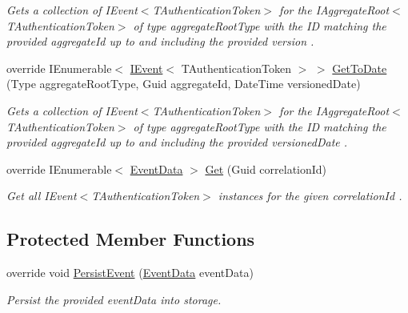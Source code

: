 \begin{DoxyCompactItemize}
\begin{DoxyCompactList}\small\item\em Gets a collection of I\+Event$<$\+T\+Authentication\+Token$>$ for the I\+Aggregate\+Root$<$\+T\+Authentication\+Token$>$ of type {\itshape aggregate\+Root\+Type}  with the ID matching the provided {\itshape aggregate\+Id}  up to and including the provided {\itshape version} . \end{DoxyCompactList}\item 
override I\+Enumerable$<$ \hyperlink{interfaceCqrs_1_1Events_1_1IEvent}{I\+Event}$<$ T\+Authentication\+Token $>$ $>$ \hyperlink{classCqrs_1_1Azure_1_1BlobStorage_1_1Events_1_1BlobStorageEventStore_a3c2ec49781bbcf7e0c2549133c160591_a3c2ec49781bbcf7e0c2549133c160591}{Get\+To\+Date} (Type aggregate\+Root\+Type, Guid aggregate\+Id, Date\+Time versioned\+Date)
\begin{DoxyCompactList}\small\item\em Gets a collection of I\+Event$<$\+T\+Authentication\+Token$>$ for the I\+Aggregate\+Root$<$\+T\+Authentication\+Token$>$ of type {\itshape aggregate\+Root\+Type}  with the ID matching the provided {\itshape aggregate\+Id}  up to and including the provided {\itshape versioned\+Date} . \end{DoxyCompactList}\item 
override I\+Enumerable$<$ \hyperlink{classCqrs_1_1Events_1_1EventData}{Event\+Data} $>$ \hyperlink{classCqrs_1_1Azure_1_1BlobStorage_1_1Events_1_1BlobStorageEventStore_a660c786205693ee34a11e205c6d136ad_a660c786205693ee34a11e205c6d136ad}{Get} (Guid correlation\+Id)
\begin{DoxyCompactList}\small\item\em Get all I\+Event$<$\+T\+Authentication\+Token$>$ instances for the given {\itshape correlation\+Id} . \end{DoxyCompactList}\end{DoxyCompactItemize}
\subsection*{Protected Member Functions}
\begin{DoxyCompactItemize}
\item 
override void \hyperlink{classCqrs_1_1Azure_1_1BlobStorage_1_1Events_1_1BlobStorageEventStore_aa27a352076b8967498407d24814f7c83_aa27a352076b8967498407d24814f7c83}{Persist\+Event} (\hyperlink{classCqrs_1_1Events_1_1EventData}{Event\+Data} event\+Data)
\begin{DoxyCompactList}\small\item\em Persist the provided {\itshape event\+Data}  into storage. \end{DoxyCompactList}\end{DoxyCompactItemize}
